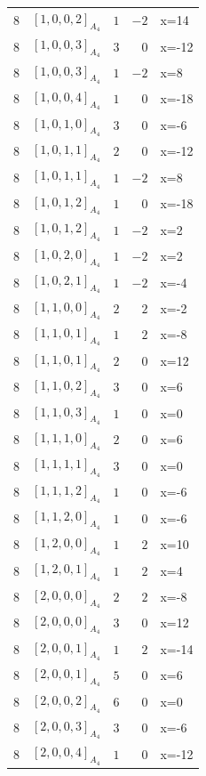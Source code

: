 \documentclass[11pt]{article}
\newcommand{\Dynkin}[1]{#1}
\begin{document}
\begin{longtable}{r l r r l}
8 & $\Dynkin{[1,0,0,2]_{A_4}}$ & $1$ & $-2$ & x=14\\
8 & $\Dynkin{[1,0,0,3]_{A_4}}$ & $3$ & $0$ & x=-12\\
8 & $\Dynkin{[1,0,0,3]_{A_4}}$ & $1$ & $-2$ & x=8\\
8 & $\Dynkin{[1,0,0,4]_{A_4}}$ & $1$ & $0$ & x=-18\\
8 & $\Dynkin{[1,0,1,0]_{A_4}}$ & $3$ & $0$ & x=-6\\
8 & $\Dynkin{[1,0,1,1]_{A_4}}$ & $2$ & $0$ & x=-12\\
8 & $\Dynkin{[1,0,1,1]_{A_4}}$ & $1$ & $-2$ & x=8\\
8 & $\Dynkin{[1,0,1,2]_{A_4}}$ & $1$ & $0$ & x=-18\\
8 & $\Dynkin{[1,0,1,2]_{A_4}}$ & $1$ & $-2$ & x=2\\
8 & $\Dynkin{[1,0,2,0]_{A_4}}$ & $1$ & $-2$ & x=2\\
8 & $\Dynkin{[1,0,2,1]_{A_4}}$ & $1$ & $-2$ & x=-4\\
8 & $\Dynkin{[1,1,0,0]_{A_4}}$ & $2$ & $2$ & x=-2\\
8 & $\Dynkin{[1,1,0,1]_{A_4}}$ & $1$ & $2$ & x=-8\\
8 & $\Dynkin{[1,1,0,1]_{A_4}}$ & $2$ & $0$ & x=12\\
8 & $\Dynkin{[1,1,0,2]_{A_4}}$ & $3$ & $0$ & x=6\\
8 & $\Dynkin{[1,1,0,3]_{A_4}}$ & $1$ & $0$ & x=0\\
8 & $\Dynkin{[1,1,1,0]_{A_4}}$ & $2$ & $0$ & x=6\\
8 & $\Dynkin{[1,1,1,1]_{A_4}}$ & $3$ & $0$ & x=0\\
8 & $\Dynkin{[1,1,1,2]_{A_4}}$ & $1$ & $0$ & x=-6\\
8 & $\Dynkin{[1,1,2,0]_{A_4}}$ & $1$ & $0$ & x=-6\\
8 & $\Dynkin{[1,2,0,0]_{A_4}}$ & $1$ & $2$ & x=10\\
8 & $\Dynkin{[1,2,0,1]_{A_4}}$ & $1$ & $2$ & x=4\\
8 & $\Dynkin{[2,0,0,0]_{A_4}}$ & $2$ & $2$ & x=-8\\
8 & $\Dynkin{[2,0,0,0]_{A_4}}$ & $3$ & $0$ & x=12\\
8 & $\Dynkin{[2,0,0,1]_{A_4}}$ & $1$ & $2$ & x=-14\\
8 & $\Dynkin{[2,0,0,1]_{A_4}}$ & $5$ & $0$ & x=6\\
8 & $\Dynkin{[2,0,0,2]_{A_4}}$ & $6$ & $0$ & x=0\\
8 & $\Dynkin{[2,0,0,3]_{A_4}}$ & $3$ & $0$ & x=-6\\
8 & $\Dynkin{[2,0,0,4]_{A_4}}$ & $1$ & $0$ & x=-12\\

\end{longtable}
\end{document}
